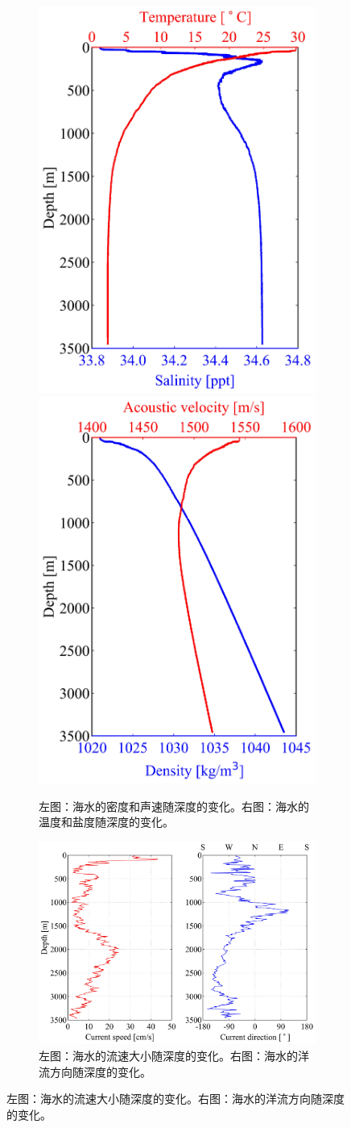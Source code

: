 \begin{figure}[!htb] 
    \begin{subfigure}[!htb]{0.90\textwidth}
    \centering
        \includegraphics[width=0.44\linewidth]{img/pathfinder_temperature.jpg}
        \includegraphics[width=0.44\linewidth]{img/pathfinder_sound_speed.jpg}
        \caption{左图：海水的密度和声速随深度的变化。右图：海水的温度和盐度随深度的变化。} 
    \end{subfigure}

    \begin{subfigure}[!htb]{0.90\textwidth}
        \centering
        \includegraphics[width=0.90\linewidth]{img/pathfinder_current.jpg}
        \caption{左图：海水的流速大小随深度的变化。右图：海水的洋流方向随深度的变化。} 
    \end{subfigure}


\end{figure}
